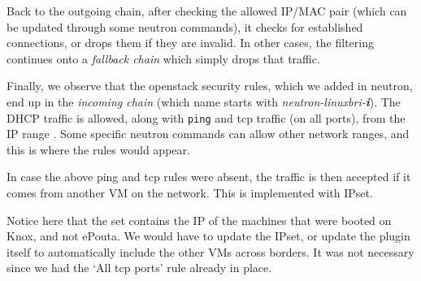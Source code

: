 Back to the outgoing chain, after checking the allowed IP/MAC pair
(which can be updated through some neutron commands), it checks for
established connections, or drops them if they are invalid. In other
cases, the filtering continues onto a \emph{fallback chain} which
simply drops that traffic.


Finally, we observe that the openstack security rules, which we added
in neutron, end up in the \emph{incoming chain} (which name starts
with \emph{neutron-linuxbri-\textbf{i}}). The DHCP traffic is allowed,
along with \texttt{ping} and tcp traffic (on all ports), from the IP
range . Some specific neutron commands can allow
other network ranges, and this is where the rules would appear.


In case the above ping and tcp rules were absent, the traffic is then
accepted if it comes from another VM on the network. This is
implemented with IPset.


Notice here that the set contains the IP of the machines that were
booted on Knox, and not ePouta. We would have to update the IPset, or
update the plugin itself to automatically include the other VMs across
borders. It was not necessary since we had the `All tcp ports' rule
already in place.
